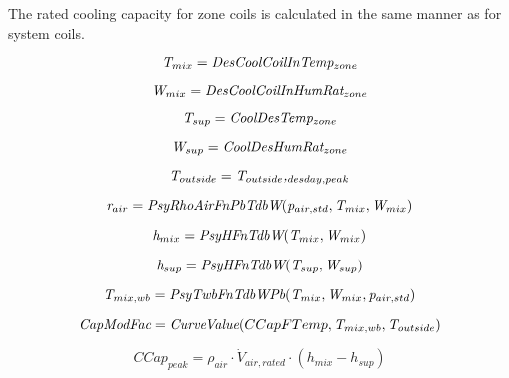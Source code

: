 The rated cooling capacity for zone coils is calculated in the same manner as for system coils.

\begin{equation}
\emph{T\(_{mix}\)} = \emph{DesCoolCoilInTemp\(_{zone}\)}
\end{equation}

\begin{equation}
\emph{W\(_{mix}\)} = \emph{DesCoolCoilInHumRat\(_{zone}\)}
\end{equation}

\begin{equation}
\emph{T\(_{sup}\)} = \emph{CoolDesTemp\(_{zone}\)}
\end{equation}

\begin{equation}
\emph{W\(_{sup}\)} = \emph{CoolDesHumRat\(_{zone}\)}
\end{equation}

\begin{equation}
\emph{T\(_{outside}\)} = \emph{T\(_{outside}\),\(_{desday,peak}\)}
\end{equation}

\begin{equation}
\emph{r\(_{air}\)} = \emph{PsyRhoAirFnPbTdbW}(\emph{p\(_{air,std}\)}, \emph{T\(_{mix}\)},\emph{W\(_{mix}\)})
\end{equation}

\begin{equation}
\emph{h\(_{mix}\)} = \emph{PsyHFnTdbW}(\emph{T\(_{mix}\)},\emph{W\(_{mix}\)})
\end{equation}

\begin{equation}
\emph{h\(_{sup}\)} = \emph{PsyHFnTdbW}(\emph{T\(_{sup}\)},\emph{W\(_{sup}\)})
\end{equation}

\begin{equation}
\emph{T\(_{mix,wb}\)} = \emph{PsyTwbFnTdbWPb}(\emph{T\(_{mix}\)},\emph{W\(_{mix}\)}, \emph{p\(_{air,std}\)})
\end{equation}

\begin{equation}
\emph{CapModFac} = \emph{CurveValue}(CCapFTemp,\emph{T\(_{mix,wb}\)},\emph{T\(_{outside}\)})
\end{equation}

\begin{equation}
CCap_{peak} = \rho_{air} \cdot \dot V_{air,rated} \cdot (h_{mix} - h_{sup})
\end{equation}

